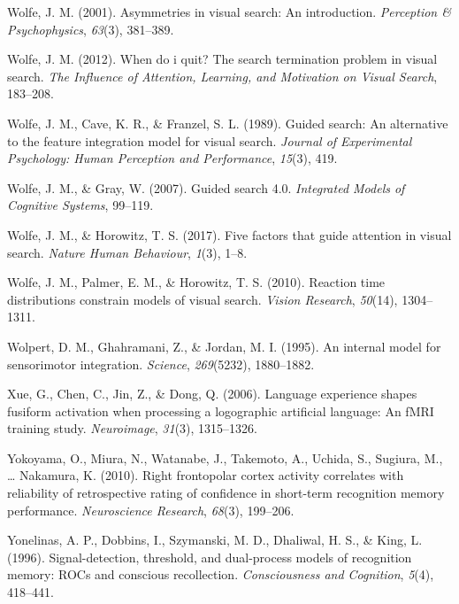 \documentclass[12pt,twoside]{reedthesis}
\begin{document}
\leavevmode\hypertarget{ref-wolfe2001asymmetries}{}%
Wolfe, J. M. (2001). Asymmetries in visual search: An introduction. \emph{Perception \& Psychophysics}, \emph{63}(3), 381--389.

\leavevmode\hypertarget{ref-wolfe2012quit}{}%
Wolfe, J. M. (2012). When do i quit? The search termination problem in visual search. \emph{The Influence of Attention, Learning, and Motivation on Visual Search}, 183--208.

\leavevmode\hypertarget{ref-wolfe1989guided}{}%
Wolfe, J. M., Cave, K. R., \& Franzel, S. L. (1989). Guided search: An alternative to the feature integration model for visual search. \emph{Journal of Experimental Psychology: Human Perception and Performance}, \emph{15}(3), 419.

\leavevmode\hypertarget{ref-wolfe2007guided}{}%
Wolfe, J. M., \& Gray, W. (2007). Guided search 4.0. \emph{Integrated Models of Cognitive Systems}, 99--119.

\leavevmode\hypertarget{ref-wolfe2017five}{}%
Wolfe, J. M., \& Horowitz, T. S. (2017). Five factors that guide attention in visual search. \emph{Nature Human Behaviour}, \emph{1}(3), 1--8.

\leavevmode\hypertarget{ref-wolfe2010reaction}{}%
Wolfe, J. M., Palmer, E. M., \& Horowitz, T. S. (2010). Reaction time distributions constrain models of visual search. \emph{Vision Research}, \emph{50}(14), 1304--1311.

\leavevmode\hypertarget{ref-wolpert1995internal}{}%
Wolpert, D. M., Ghahramani, Z., \& Jordan, M. I. (1995). An internal model for sensorimotor integration. \emph{Science}, \emph{269}(5232), 1880--1882.

\leavevmode\hypertarget{ref-xue2006language}{}%
Xue, G., Chen, C., Jin, Z., \& Dong, Q. (2006). Language experience shapes fusiform activation when processing a logographic artificial language: An fMRI training study. \emph{Neuroimage}, \emph{31}(3), 1315--1326.

\leavevmode\hypertarget{ref-yokoyama2010right}{}%
Yokoyama, O., Miura, N., Watanabe, J., Takemoto, A., Uchida, S., Sugiura, M., \ldots{} Nakamura, K. (2010). Right frontopolar cortex activity correlates with reliability of retrospective rating of confidence in short-term recognition memory performance. \emph{Neuroscience Research}, \emph{68}(3), 199--206.

\leavevmode\hypertarget{ref-yonelinas1996signal}{}%
Yonelinas, A. P., Dobbins, I., Szymanski, M. D., Dhaliwal, H. S., \& King, L. (1996). Signal-detection, threshold, and dual-process models of recognition memory: ROCs and conscious recollection. \emph{Consciousness and Cognition}, \emph{5}(4), 418--441.
\end{document}
